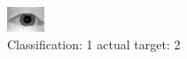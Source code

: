 \begin{figure}[h!]
\begin{center}
\includegraphics[width=0.60\columnwidth]{figures/ID967_class_1_target_2.png}
\end{center}
\caption{ Classification: 1 actual target: 2}
\label{fig:ID967_class_1_target_2}
\end{figure}
